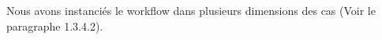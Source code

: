 Nous avons instanciés le workflow dans plusieurs dimensions des cas (Voir le paragraphe 1.3.4.2).         
 

